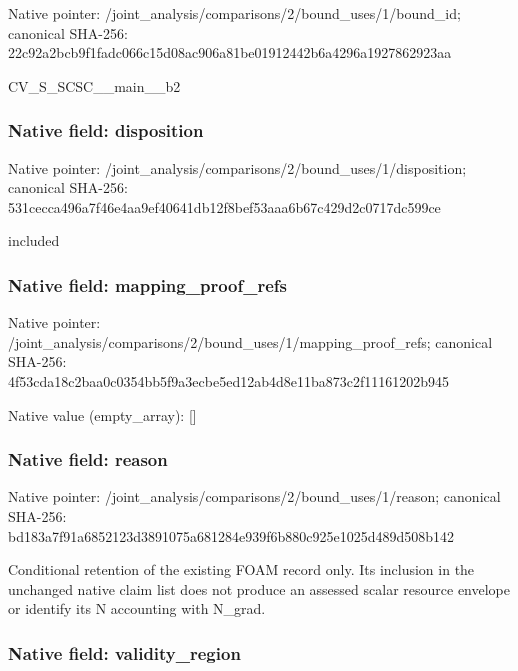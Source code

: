 \documentclass[10pt,a4paper]{article}
\begin{document}
Native pointer: /joint\_analysis/comparis\allowbreak{}ons/2/bound\_uses/1/bound\allowbreak{}\_id; canonical SHA-256: 22c92a2bcb9f1fadc066c15d\allowbreak{}08ac906a81be01912442b6a4\allowbreak{}296a1927862923aa


CV\_S\_SCSC\_\_main\_\_b2


\subsubsection{Native field: disposition}


Native pointer: /joint\_analysis/comparis\allowbreak{}ons/2/bound\_uses/1/dispo\allowbreak{}sition; canonical SHA-256: 531cecca496a7f46e4aa9ef4\allowbreak{}0641db12f8bef53aaa6b67c4\allowbreak{}29d2c0717dc599ce


included


\subsubsection{Native field: mapping\_proof\_refs}


Native pointer: /joint\_analysis/comparis\allowbreak{}ons/2/bound\_uses/1/mappi\allowbreak{}ng\_proof\_refs; canonical SHA-256: 4f53cda18c2baa0c0354bb5f\allowbreak{}9a3ecbe5ed12ab4d8e11ba87\allowbreak{}3c2f11161202b945



Native value (empty\_array): []



\subsubsection{Native field: reason}


Native pointer: /joint\_analysis/comparis\allowbreak{}ons/2/bound\_uses/1/reaso\allowbreak{}n; canonical SHA-256: bd183a7f91a6852123d38910\allowbreak{}75a681284e939f6b880c925e\allowbreak{}1025d489d508b142


Conditional retention of the existing FOAM record only. Its inclusion in the unchanged native claim list does not produce an assessed scalar resource envelope or identify its N accounting with N\_grad.


\subsubsection{Native field: validity\_region}
\end{document}
